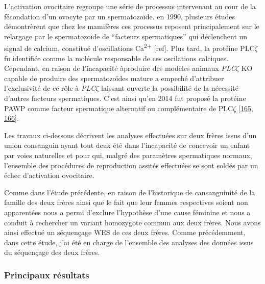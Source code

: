 \documentclass[12pt,twoside]{reedthesis}
\theoremstyle{definition}
\theoremstyle{definition}
\theoremstyle{remark}
\begin{document}
  L'activation ovocitaire regroupe une série de processus intervenant au
  cour de la fécondation d'un ovocyte par un spermatozoïde. en 1990,
  plusieurs études démontrèrent que chez les mamifères ces processus
  reposent principalement sur le relargage par le spermatozoïde de
  ``facteurs spermatiques'' qui déclenchent un signal de calcium,
  constitué d'oscillations Ca\textsuperscript{2+} {[}ref{]}. Plus tard, la
  protéine PLC\(\zeta\) fu identifiée comme la molécule responsable de ces
  oscilations calciques. Cependant, en raison de l'incapacité àproduire
  des modèles animaux \emph{PLC}\(\zeta\) KO capable de produire des
  spermatozoïdes mature a empeché d'attribuer l'exclusivité de ce rôle à
  \emph{PLC}\(\zeta\) laissant ouverte la possibilité de la nécessité
  d'autres facteurs spermatiques. C'est ainsi qu'en 2014 fut proposé la
  protéine PAWP comme facteur spermatique alternatif ou complémentaire de
  PLC\(\zeta\) {[}\protect\hyperlink{ref-Aarabi2014}{165},
  \protect\hyperlink{ref-Aarabi2014a}{166}{]}.
  
  Les travaux ci-dessous décrivent les analyses effectuées sur deux frères
  issus d'un union consanguin ayant tout deux été dans l'incapacité de
  concevoir un enfant par voies naturelles et pour qui, malgré des
  paramètres spermatiques normaux, l'ensemble des procédures de
  reproduction assités effectuées se sont soldés par un échec d'activation
  ovocitaire.
  
  Comme dans l'étude précédente, en raison de l'historique de
  cansanguinité de la famille des deux frères ainsi que le fait que leur
  femmes respectives soient non apparentées nous a permi d'exclure
  l'hypothèse d'une cause féminine et nous a conduit à rechercher un
  variant homozygote commun aux deux frères. Nous avons ainsi effectué un
  séquençage WES de ces deux frères. Comme précédemment, dans cette étude,
  j'ai été en charge de l'ensemble des analyses des données issus du
  séquençage des deux frères.
  
  \newpage
  
  
  
  \newpage
  
  \subsubsection{Principaux résultats}\label{principaux-resultats-1}
  
\end{document}
